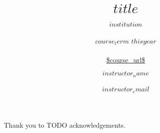 
\newcommand{\courseurl}{\url{$course_url$}}
\newcommand{\thisyear}{$thisyear$}

\newcommand{\mydetails}{%
    $instructor_name$\\\\
    $instructor_email$\\\\[1em]
    $organization$\\\\
}



\title{$title$}
\subtitle{$institution$\\\\%
$course_term$ \thisyear\\\\%
\courseurl}

\author{$instructor_name$\\\\$instructor_email$}
\date{}
\maketitle
\tableofcontents

\vspace{10pt}\noindent Thank you to TODO acknowledgements.

\def\sectionautorefname{Section}%
\def\subsectionautorefname{Section}%
\def\subsubsectionautorefname{Section}%

\nocite{*}

\newpage
